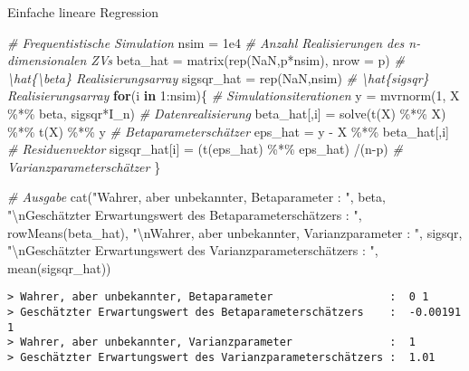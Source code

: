 \documentclass[
  8pt,
  ignorenonframetext,
]{beamer}
\newenvironment{Shaded}{\begin{snugshade}}{\end{snugshade}}
\newcommand{\AttributeTok}[1]{\textcolor[rgb]{0.77,0.63,0.00}{#1}}
\newcommand{\CommentTok}[1]{\textcolor[rgb]{0.56,0.35,0.01}{\textit{#1}}}
\newcommand{\ConstantTok}[1]{\textcolor[rgb]{0.00,0.00,0.00}{#1}}
\newcommand{\ControlFlowTok}[1]{\textcolor[rgb]{0.13,0.29,0.53}{\textbf{#1}}}
\newcommand{\DecValTok}[1]{\textcolor[rgb]{0.00,0.00,0.81}{#1}}
\newcommand{\FloatTok}[1]{\textcolor[rgb]{0.00,0.00,0.81}{#1}}
\newcommand{\FunctionTok}[1]{\textcolor[rgb]{0.00,0.00,0.00}{#1}}
\newcommand{\NormalTok}[1]{#1}
\newcommand{\OtherTok}[1]{\textcolor[rgb]{0.56,0.35,0.01}{#1}}
\newcommand{\SpecialCharTok}[1]{\textcolor[rgb]{0.00,0.00,0.00}{#1}}
\newcommand{\StringTok}[1]{\textcolor[rgb]{0.31,0.60,0.02}{#1}}
\begin{document}
\begin{frame}[fragile]{Einfache lineare Regression}
\begin{Shaded}
\begin{Highlighting}[]
\CommentTok{\# Frequentistische Simulation}
\NormalTok{nsim       }\OtherTok{=} \FloatTok{1e4}                                     \CommentTok{\# Anzahl Realisierungen des n{-}dimensionalen ZVs}
\NormalTok{beta\_hat   }\OtherTok{=} \FunctionTok{matrix}\NormalTok{(}\FunctionTok{rep}\NormalTok{(}\ConstantTok{NaN}\NormalTok{,p}\SpecialCharTok{*}\NormalTok{nsim), }\AttributeTok{nrow =}\NormalTok{ p)       }\CommentTok{\# \textbackslash{}hat\{\textbackslash{}beta\} Realisierungsarray}
\NormalTok{sigsqr\_hat }\OtherTok{=} \FunctionTok{rep}\NormalTok{(}\ConstantTok{NaN}\NormalTok{,nsim)                           }\CommentTok{\# \textbackslash{}hat\{sigsqr\} Realisierungsarray}
\ControlFlowTok{for}\NormalTok{(i }\ControlFlowTok{in} \DecValTok{1}\SpecialCharTok{:}\NormalTok{nsim)\{                                    }\CommentTok{\# Simulationsiterationen}
\NormalTok{  y             }\OtherTok{=} \FunctionTok{mvrnorm}\NormalTok{(}\DecValTok{1}\NormalTok{, X }\SpecialCharTok{\%*\%}\NormalTok{ beta, sigsqr}\SpecialCharTok{*}\NormalTok{I\_n) }\CommentTok{\# Datenrealisierung}
\NormalTok{  beta\_hat[,i]  }\OtherTok{=} \FunctionTok{solve}\NormalTok{(}\FunctionTok{t}\NormalTok{(X) }\SpecialCharTok{\%*\%}\NormalTok{ X) }\SpecialCharTok{\%*\%} \FunctionTok{t}\NormalTok{(X) }\SpecialCharTok{\%*\%}\NormalTok{ y   }\CommentTok{\# Betaparameterschätzer}
\NormalTok{  eps\_hat       }\OtherTok{=}\NormalTok{ y }\SpecialCharTok{{-}}\NormalTok{ X }\SpecialCharTok{\%*\%}\NormalTok{ beta\_hat[,i]             }\CommentTok{\# Residuenvektor}
\NormalTok{  sigsqr\_hat[i] }\OtherTok{=}\NormalTok{ (}\FunctionTok{t}\NormalTok{(eps\_hat) }\SpecialCharTok{\%*\%}\NormalTok{ eps\_hat) }\SpecialCharTok{/}\NormalTok{(n}\SpecialCharTok{{-}}\NormalTok{p)    }\CommentTok{\# Varianzparameterschätzer}
\NormalTok{\}}

\CommentTok{\# Ausgabe}
\FunctionTok{cat}\NormalTok{(}\StringTok{"Wahrer, aber unbekannter, Betaparameter                  : "}\NormalTok{, beta,}
    \StringTok{"}\SpecialCharTok{\textbackslash{}n}\StringTok{Geschätzter Erwartungswert des Betaparameterschätzers    : "}\NormalTok{, }\FunctionTok{rowMeans}\NormalTok{(beta\_hat),}
    \StringTok{"}\SpecialCharTok{\textbackslash{}n}\StringTok{Wahrer, aber unbekannter, Varianzparameter               : "}\NormalTok{, sigsqr,}
    \StringTok{"}\SpecialCharTok{\textbackslash{}n}\StringTok{Geschätzter Erwartungswert des Varianzparameterschätzers : "}\NormalTok{, }\FunctionTok{mean}\NormalTok{(sigsqr\_hat))}
\end{Highlighting}
\end{Shaded}

\begin{verbatim}
> Wahrer, aber unbekannter, Betaparameter                  :  0 1 
> Geschätzter Erwartungswert des Betaparameterschätzers    :  -0.00191 1 
> Wahrer, aber unbekannter, Varianzparameter               :  1 
> Geschätzter Erwartungswert des Varianzparameterschätzers :  1.01
\end{verbatim}
\end{frame}
\end{document}
